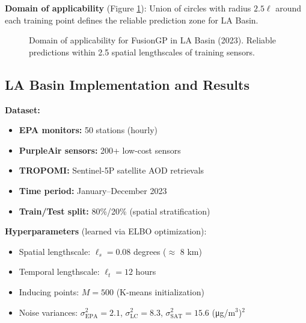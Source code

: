 \documentclass[11pt,letterpaper]{article}
\begin{document}
\textbf{Domain of applicability} (Figure \ref{fig:ood_domain}): Union of circles with radius $2.5\ell$ around each training point defines the reliable prediction zone for LA Basin.

\begin{figure}[h]
\centering
\caption{Domain of applicability for FusionGP in LA Basin (2023). Reliable predictions within 2.5 spatial lengthscales of training sensors.}
\label{fig:ood_domain}
\end{figure}

\subsection{LA Basin Implementation and Results}

\textbf{Dataset:}
\begin{itemize}
    \item \textbf{EPA monitors:} 50 stations (hourly)
    \item \textbf{PurpleAir sensors:} 200+ low-cost sensors
    \item \textbf{TROPOMI:} Sentinel-5P satellite AOD retrievals
    \item \textbf{Time period:} January--December 2023
    \item \textbf{Train/Test split:} 80\%/20\% (spatial stratification)
\end{itemize}

\textbf{Hyperparameters} (learned via ELBO optimization):
\begin{itemize}
    \item Spatial lengthscale: $\ell_s = 0.08$ degrees ($\approx$ 8 km)
    \item Temporal lengthscale: $\ell_t = 12$ hours
    \item Inducing points: $M = 500$ (K-means initialization)
    \item Noise variances: $\sigma_{\text{EPA}}^2 = 2.1$, $\sigma_{\text{LC}}^2 = 8.3$, $\sigma_{\text{SAT}}^2 = 15.6$ (μg/m$^3$)$^2$
\end{itemize}
\end{document}
